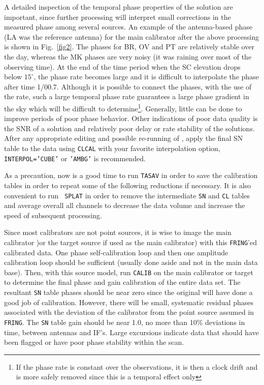       A detailed inspection of the temporal phase properties of the
solution are important, since further processing will interpret small
corrections in the measured phase among several sources.  An example
of the antenna-based phase (LA was the reference antenna) for the main
calibrator after the above processing is shown in Fig.~\ref{fig2}.
The phases for BR, OV and PT are relatively stable over the day,
whereas the MK phases are very noisy (it was raining over most of the
observing time).  At the end of the time period when the SC elevation
drops below $15^\circ$, the phase rate becomes large and it is
difficult to interpolate the phase after time 1/00.7.  Although it is
possible to connect the phases, with the use of the rate, such a large
temporal phase rate guarantees a large phase gradient in the sky which
will be difficult to determine\footnote{If the phase rate is constant
over the observations, it is then a clock drift and is more safely
removed since this is a temporal effect only}.  Generally, little can
be done to improve periods of poor phase behavior.  Other indications
of poor data quality is the SNR of a solution and relatively poor
delay or rate stability of the solutions.  After any appropriate
editing and possible re-running of \FR, apply the final SN table to
the data using {\tt CLCAL} with your favorite interpolation option,
{\tt INTERPOL='CUBE'} or {\tt 'AMBG'} is recommended.

     As a precaution, now is a good time to run {\tt TASAV} in order
to save the calibration tables in order to repeat some of the
following reductions if necessary.  It is also convenient to run {\tt
SPLAT} in order to remove the intermediate {\tt SN} and {\tt CL}
tables and average overall all channels to decrease the data volume
and increase the speed of subsequent processing.

     Since most calibrators are not point sources, it is wise to image
the main calibrator )or the target source if used as the main
calibrator) with this {\tt FRING}'ed calibrated data.  One phase
self-calibration loop and then one amplitude calibration loop should
be sufficient (usually done aside and not in the main data base).
Then, with this source model, run {\tt CALIB} on the main calibrator
or target to determine the final phase and gain calibration of the
entire data set.  The resultant {\tt SN} table phases should be near
zero since the original \FR will have done a good job of calibration.
However, there will be small, systematic residual phases associated
with the deviation of the calibrator from the point source assumed in
{\tt FRING}.  The {\tt SN} table gain should be near 1.0, no more than
10\% deviations in time, between antennas and IF's.  Large excursions
indicate data that should have been flagged or have poor phase
stability within the scan.

